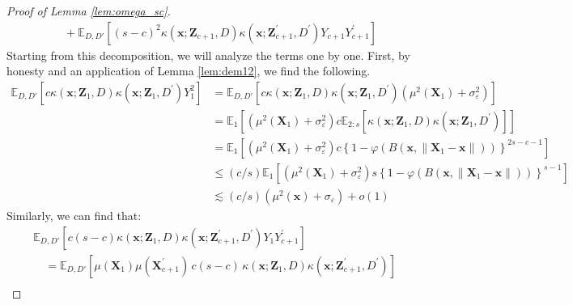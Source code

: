 \documentclass[letterpaper,10pt]{article}
\numberwithin{equation}{section}
\numberwithin{thm}{section}
\numberwithin{lem}{section}
\numberwithin{cor}{section}
\newcommand{\E}{\mathbb{E}}
\newcommand{\1}{\mathbbm{1}}
\begin{document}
\begin{proof}[Proof of Lemma \ref{lem:omega_sc}]
\begin{equation}
\begin{aligned}
			 & \quad + \E_{D, D'}\left[(s-c)^2 \kappa\left(\mathbf{x}; \mathbf{Z}_{c+1}, D\right)\kappa\left(\mathbf{x}; \mathbf{Z}_{c+1}^{\prime}, D^{\prime}\right)Y_{c+1}Y_{c+1}^{\prime}\right]
		\end{aligned}
	\end{equation}
	Starting from this decomposition, we will analyze the terms one by one.
	First, by honesty and an application of Lemma \ref{lem:dem12}, we find the following.
	\begin{equation}
		\begin{aligned}
			\E_{D, D'}\left[c\kappa\left(\mathbf{x}; \mathbf{Z}_{1}, D\right)\kappa\left(\mathbf{x}; \mathbf{Z}_{1}, D^{\prime}\right)Y_{1}^{2}\right]
			 & = \E_{D, D'}\left[c\kappa\left(\mathbf{x}; \mathbf{Z}_{1}, D\right)\kappa\left(\mathbf{x}; \mathbf{Z}_{1}, D^{\prime}\right)\left(\mu^2(\mathbf{X}_1) + \sigma_{\varepsilon}^{2}\right)\right]                   \\
			 & = \E_{1}\left[\left(\mu^2(\mathbf{X}_1) + \sigma_{\varepsilon}^{2}\right) c\E_{2:s}\left[\kappa\left(\mathbf{x}; \mathbf{Z}_{1}, D\right)\kappa\left(\mathbf{x}; \mathbf{Z}_{1}, D^{\prime}\right)\right]\right] \\
			 & = \E_{1}\left[\left(\mu^2(\mathbf{X}_1) + \sigma_{\varepsilon}^{2}\right) c\left\{1 - \varphi\left(B\left(\mathbf{x}, \|\mathbf{X}_1 - \mathbf{x}\|\right)\right)\right\}^{2s-c-1}\right]                        \\
			 & \leq (c/s) \E_{1}\left[\left(\mu^2(\mathbf{X}_1) + \sigma_{\varepsilon}^{2}\right) s\left\{1 - \varphi\left(B\left(\mathbf{x}, \|\mathbf{X}_1 - \mathbf{x}\|\right)\right)\right\}^{s-1}\right]                  \\
			 & \lesssim (c/s)\left(\mu^2(\mathbf{x}) + \sigma_{\varepsilon}\right) + o(1)
		\end{aligned}
	\end{equation}
	Similarly, we can find that:
	\begin{equation}
		\begin{aligned}
			 & \E_{D, D'}\left[c(s-c) \kappa\left(\mathbf{x}; \mathbf{Z}_{1}, D\right)\kappa\left(\mathbf{x}; \mathbf{Z}_{c+1}^{\prime}, D^{\prime}\right)Y_{1}Y_{c+1}^{\prime}\right]                                          \\
			 & \quad = \E_{D, D'}\left[\mu(\mathbf{X}_1)\mu(\mathbf{X}_{c+1}^{\prime}) \, c(s-c) \, \kappa\left(\mathbf{x}; \mathbf{Z}_{1}, D\right)\kappa\left(\mathbf{x}; \mathbf{Z}_{c+1}^{\prime}, D^{\prime}\right)\right] \\

\end{aligned}
\end{equation}
\end{proof}
\end{document}
